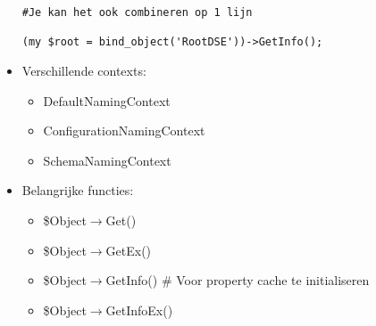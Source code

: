 \documentclass{report}
\begin{document}
\begin{itemize}
\begin{lstlisting}
#Je kan het ook combineren op 1 lijn

(my $root = bind_object('RootDSE'))->GetInfo();
    \end{lstlisting}

    \item[\info] Verschillende contexts:
    \begin{itemize}
        \item[\info] DefaultNamingContext
        \item[\info] ConfigurationNamingContext
        \item[\info] SchemaNamingContext
    \end{itemize}

    \item[\info] Belangrijke functies:
    \begin{itemize}
        \item[\info] \$Object$\rightarrow$Get()
        \item[\info] \$Object$\rightarrow$GetEx()
        \item[\info] \$Object$\rightarrow$GetInfo() \# Voor property cache te initialiseren
        \item[\info] \$Object$\rightarrow$GetInfoEx()
    \end{itemize}
\end{itemize}
\end{document}
